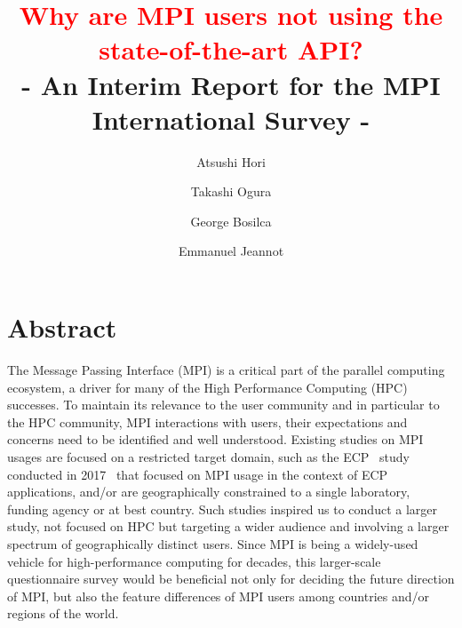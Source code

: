 \documentclass[sigconf,nonacm]{acmart}
\begin{document}
\title{\textcolor{red}{Why are MPI users not using the state-of-the-art API?}\\
- An Interim Report for the MPI International Survey -}


\author{Atsushi Hori}
\author{Takashi Ogura}

\author{George Bosilca}

\author{Emmanuel Jeannot}

\maketitle

\section{Abstract}

The Message Passing Interface (MPI) is a critical part of the parallel computing
ecosystem, a driver for many of the High Performance Computing (HPC) successes.
To maintain its relevance to the user community and in particular to the HPC
community, MPI interactions with users, their expectations and concerns need
to be identified and well understood.
%
Existing studies on MPI usages are focused on a restricted target domain,
such as the ECP~\cite{ECP} study conducted in 2017~\cite{osti_1462877} that focused
on MPI usage in the context of ECP applications, and/or are geographically
constrained to a single laboratory, funding agency or at best country.
%
Such studies inspired us to conduct a larger study, not focused on HPC but
targeting a wider audience and involving a larger spectrum of geographically
distinct users. Since MPI is being a widely-used vehicle for high-performance
computing for decades, this larger-scale questionnaire survey would be
beneficial not only for deciding the future direction of MPI, but also the
feature differences of MPI users among countries and/or regions of the world.
\end{document}
